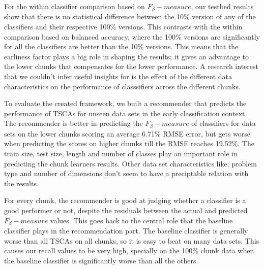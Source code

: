 For the within classifier comparison based on $F_{\beta}-measure$, our testbed results show that there is no statistical difference between the 10\% version of any of the classifiers and their respective 100\% versions.
This contrasts with the within comparison based on balanced accuracy, where the 100\% versions are significantly for all the classifiers are better than the 10\% versions.
This means that the earliness factor plays a big role in shaping the results; it gives an advantage to the lower chunks that compensates for the lower performance.
A research interest that we couldn't infer useful insights for is the effect of the different data characteristics on the performance of classsifiers across the different chunks.

To evaluate the created framework, we built a recommender that predicts the performance of TSCAs for unseen data sets in the early classification context.
The recommender is better in predicting the $F_{\beta}-measure$ of classifiers for data sets on the lower chunks scoring an average 6.71\% RMSE error,
but gets worse when predicting the scores on higher chunks till the RMSE reaches 19.52\%.
The train size, test size, length and number of classes play an important role in predicting the chunk learners results.
Other data set characteristics like; problem type and number of dimensions don't seem to have a preciptable relation with the results.

For every chunk, the recommender is good at judging whether a classifier is a good performer or not, despite the residuals between the actual and predicted $F_{\beta}-measure$ values.
This goes back to the central role that the baseline classifier plays in the recommendation part.
The baseline classifier is generally worse than all TSCAs on all chunks, so it is easy to beat on many data sets.
This causes our recall values to be very high, specially on the 100\% chunk data when the baseline classifier is significantly worse than all the others.

